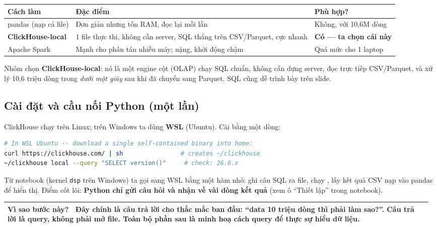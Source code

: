\documentclass[11pt,a4paper]{article}
\makeatletter
\newcommand{\code}[1]{\texttt{\detokenize{#1}}}
\newenvironment{whybox}{%
  \par\smallskip\noindent\begin{tabular}{@{}p{0.985\linewidth}@{}}
  \arrayrulecolor{themecol}\hline\rule{0pt}{1.1em}\textbf{\color{themecol}Vì sao bước này?}\ \ignorespaces}{%
  \\\hline\end{tabular}\par\smallskip}
\makeatother
\begin{document}
\begin{center}\small
\begin{tabularx}{\linewidth}{@{}lXl@{}}
\toprule
\rowcolor{rowtint}\textbf{Cách làm} & \textbf{Đặc điểm} & \textbf{Phù hợp?} \\
\midrule
pandas (nạp cả file) & Đơn giản nhưng tốn RAM, đọc lại mỗi lần & Không, với 10,6M dòng \\
\textbf{ClickHouse-local} & 1 file thực thi, không cần server, SQL thẳng trên CSV/Parquet, cực nhanh & \textbf{Có — ta chọn cái này} \\
Apache Spark & Mạnh cho phân tán nhiều máy; nặng, khởi động chậm & Quá mức cho 1 laptop \\
\bottomrule
\end{tabularx}
\end{center}

\noindent Nhóm chọn \textbf{ClickHouse-local}: nó là một engine cột (OLAP) chạy SQL chuẩn,
không cần dựng server, đọc trực tiếp CSV/Parquet, và xử lý 10,6 triệu dòng trong \textit{dưới một
giây} sau khi đã chuyển sang Parquet. SQL cũng dễ trình bày trên slide.

\subsection{Cài đặt và cầu nối Python (một lần)}
ClickHouse chạy trên Linux; trên Windows ta dùng \textbf{WSL} (Ubuntu). Cài bằng một dòng:
\begin{lstlisting}[language=bash]
# In WSL Ubuntu -- download a single self-contained binary into home:
curl https://clickhouse.com/ | sh                # creates ~/clickhouse
~/clickhouse local --query "SELECT version()"     # check: 26.6.x
\end{lstlisting}

\noindent Từ notebook (kernel \texttt{dsp} trên Windows) ta gọi sang WSL bằng một hàm nhỏ:
ghi câu SQL ra file, chạy \code{clickhouse local}, lấy kết quả CSV nạp vào pandas để hiển thị.
Điểm cốt lõi: \textbf{Python chỉ gửi câu hỏi và nhận về vài dòng kết quả} (xem ô ``Thiết lập''
trong notebook).

\begin{whybox}
Đây chính là câu trả lời cho thắc mắc ban đầu: ``data 10 triệu dòng thì phải làm sao?''. Câu trả
lời là \textbf{query}, không phải mở file. Toàn bộ phần sau là minh hoạ cách query để thực sự
hiểu dữ liệu.
\end{whybox}

\end{document}
